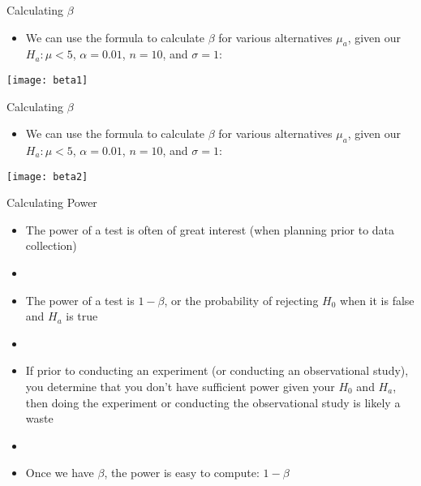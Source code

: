 \documentclass[xcolor=dvipsnames]{beamer}
\begin{document}
\begin{frame}{Calculating $\beta$}
	\begin{itemize}
		\item We can use the formula to calculate $\beta$ for various alternatives $\mu_a$, given our $H_a: \mu < 5$, $\alpha = 0.01$, $n = 10$, and $\sigma = 1$: 
	\end{itemize}
\begin{center}
	\texttt{[image: beta1]}
\end{center}
\end{frame}

\begin{frame}{Calculating $\beta$}
	\begin{itemize}
		\item We can use the formula to calculate $\beta$ for various alternatives $\mu_a$, given our $H_a: \mu < 5$, $\alpha = 0.01$, $n = 10$, and $\sigma = 1$: 
	\end{itemize}
	\begin{center}
		\texttt{[image: beta2]}
	\end{center}
\end{frame}

\begin{frame}{Calculating Power}
	\begin{itemize}
		\item The power of a test is often of great interest (when planning prior to data collection) \pause
		\item[]
		\item The power of a test is $1-\beta$, or the probability of rejecting $H_0$ when it is false and $H_a$ is true \pause
		\item[]
		\item If prior to conducting an experiment (or conducting an observational study), you determine that you don't have sufficient power given your $H_0$ and $H_a$, then doing the experiment or conducting the observational study is likely a waste \pause
		\item[]
		\item Once we have $\beta$, the power is easy to compute: $1-\beta$
	\end{itemize}
\end{frame}
\end{document}
